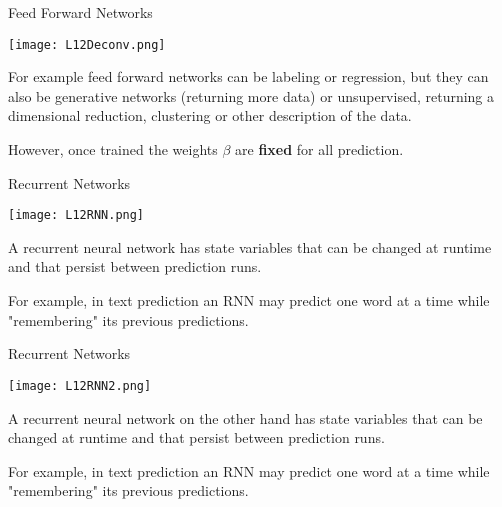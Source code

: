 \documentclass[10pt, table, dvipsnames,xcdraw, handout]{beamer}
\begin{document}
\begin{frame}[fragile]{Feed Forward Networks}
  \begin{minipage}[t][0.5\textheight][t]{\textwidth}
	\centering \texttt{[image: L12Deconv.png]} 
  \end{minipage}
  \vfill
\begin{minipage}[t][0.5\textheight][t]{\textwidth}
For example feed forward networks can be labeling or regression, but they can also be generative networks (returning more data) or unsupervised, returning a dimensional reduction, clustering or other description of the data. \newline \pause

However, once trained the weights $\beta$ are \textbf{fixed} for all prediction.
\end{minipage}
\end{frame}



\begin{frame}[fragile]{Recurrent Networks}
  \begin{minipage}[t][0.5\textheight][t]{\textwidth}
	\centering \texttt{[image: L12RNN.png]} 
  \end{minipage}
  \vfill
\begin{minipage}[t][0.5\textheight][t]{\textwidth}
A recurrent neural network has state variables that can be changed at runtime and that persist between prediction runs.\pause\newline

For example, in text prediction an RNN may predict one word at a time while "remembering" its previous predictions. 
\end{minipage}
\end{frame}



\begin{frame}[fragile]{Recurrent Networks}
  \begin{minipage}[t][0.5\textheight][t]{\textwidth}
	\centering \texttt{[image: L12RNN2.png]} 
  \end{minipage}
  \vfill
\begin{minipage}[t][0.5\textheight][t]{\textwidth}
A recurrent neural network on the other hand has state variables that can be changed at runtime and that persist between prediction runs.\newline

For example, in text prediction an RNN may predict one word at a time while "remembering" its previous predictions. 
\end{minipage}
\end{frame}
\end{document}
